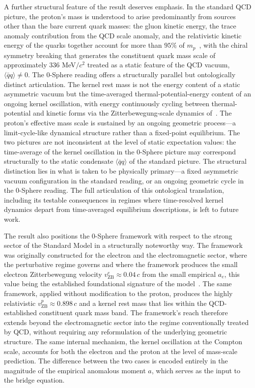 \documentclass[%
 reprint, amsmath,amssymb, aps, prc, ]{revtex4-2}
\numberwithin{equation}{section}
\newcommand{\vZB}{v_{\text{ZB}}}
\begin{document}
A further structural feature of the result deserves emphasis.
In the standard QCD picture, the proton's mass is understood to arise predominantly from sources other than the bare current quark masses: the gluon kinetic energy, the trace anomaly contribution from the QCD scale anomaly, and the relativistic kinetic energy of the quarks together account for more than $95\%$ of $m_p$~\cite{Ji1995,Yang2018}, with the chiral symmetry breaking that generates the constituent quark mass scale of approximately $336$ MeV$/c^2$ treated as a static feature of the QCD vacuum, $\langle \bar{q} q \rangle \neq 0$.
The 0-Sphere reading offers a structurally parallel but ontologically distinct articulation.
The kernel rest mass is not the energy content of a static asymmetric vacuum but the time-averaged thermal-potential-energy content of an ongoing kernel oscillation, with energy continuously cycling between thermal-potential and kinetic forms via the Zitterbewegung-scale dynamics of~\cite{Hanamura1,Hanamura10}.
The proton's effective mass scale is sustained by an ongoing geometric process---a limit-cycle-like dynamical structure rather than a fixed-point equilibrium.
The two pictures are not inconsistent at the level of static expectation values: the time-average of the kernel oscillation in the 0-Sphere picture may correspond structurally to the static condensate $\langle \bar{q} q \rangle$ of the standard picture.
The structural distinction lies in what is taken to be physically primary---a fixed asymmetric vacuum configuration in the standard reading, or an ongoing geometric cycle in the 0-Sphere reading.
The full articulation of this ontological translation, including its testable consequences in regimes where time-resolved kernel dynamics depart from time-averaged equilibrium descriptions, is left to future work.

The result also positions the 0-Sphere framework with respect to the strong sector of the Standard Model in a structurally noteworthy way.
The framework was originally constructed for the electron and the electromagnetic sector, where the perturbative regime governs and where the framework produces the small electron Zitterbewegung velocity $\vZB^e \approx 0.04\,c$ from the small empirical $a_e$, this value being the established foundational signature of the model~\cite{Hanamura10}.
The same framework, applied without modification to the proton, produces the highly relativistic $\vZB^p \approx 0.898\,c$ and a kernel rest mass that lies within the QCD-established constituent quark mass band.
The framework's reach therefore extends beyond the electromagnetic sector into the regime conventionally treated by QCD, without requiring any reformulation of the underlying geometric structure.
The same internal mechanism, the kernel oscillation at the Compton scale, accounts for both the electron and the proton at the level of mass-scale prediction.
The difference between the two cases is encoded entirely in the magnitude of the empirical anomalous moment $a$, which serves as the input to the bridge equation.
\end{document}
